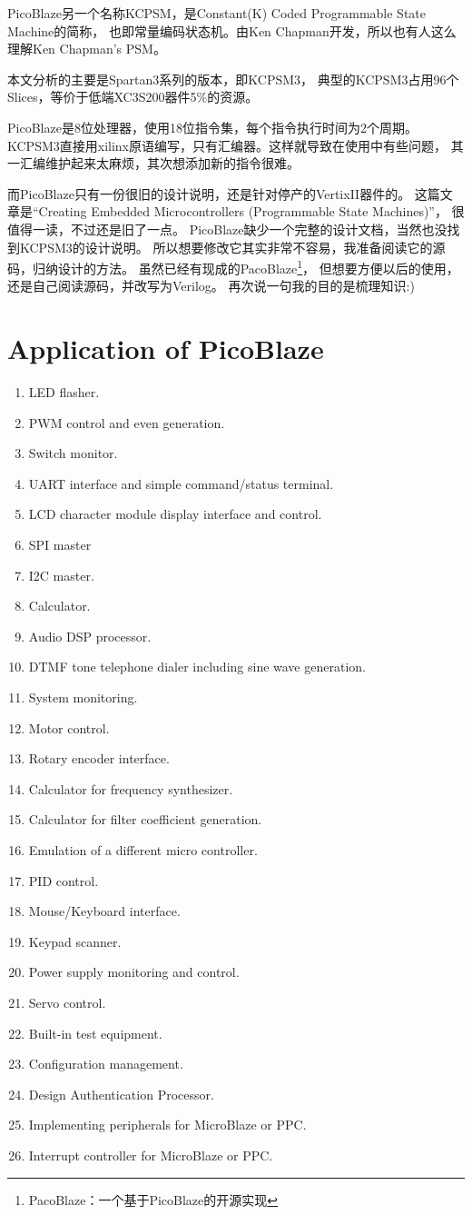 PicoBlaze另一个名称KCPSM，是Constant(K) Coded Programmable State Machine的简称，
也即常量编码状态机。由Ken Chapman开发，所以也有人这么理解Ken Chapman's PSM。

本文分析的主要是Spartan3系列的版本，即KCPSM3，
典型的KCPSM3占用96个Slices，等价于低端XC3S200器件5\%的资源。

PicoBlaze是8位处理器，使用18位指令集，每个指令执行时间为2个周期。 
KCPSM3直接用xilinx原语编写，只有汇编器。这样就导致在使用中有些问题，
其一汇编维护起来太麻烦，其次想添加新的指令很难。

而PicoBlaze只有一份很旧的设计说明，还是针对停产的VertixII器件的。
这篇文章是“Creating Embedded Microcontrollers (Programmable State Machines)”，
很值得一读，不过还是旧了一点。
PicoBlaze缺少一个完整的设计文档，当然也没找到KCPSM3的设计说明。
所以想要修改它其实非常不容易，我准备阅读它的源码，归纳设计的方法。
虽然已经有现成的PacoBlaze\footnote{PacoBlaze：一个基于PicoBlaze的开源实现}，
但想要方便以后的使用，还是自己阅读源码，并改写为Verilog。
再次说一句我的目的是梳理知识:)

\clearpage
\section{Application of PicoBlaze}
\begin{enumerate}
\item LED flasher.
\item PWM control and even generation.
\item Switch monitor.
\item UART interface and simple command/status terminal.
\item LCD character module display interface and control.
\item SPI master
\item I2C master.
\item Calculator.
\item Audio DSP processor.
\item DTMF tone telephone dialer including sine wave generation.
\item System monitoring.
\item Motor control.
\item Rotary encoder interface.
\item Calculator for frequency synthesizer.
\item Calculator for filter coefficient generation.
\item Emulation of a different micro controller.
\item PID control.
\item Mouse/Keyboard interface.
\item Keypad scanner.
\item Power supply monitoring and control.
\item Servo control.
\item Built-in test equipment.
\item Configuration management.
\item Design Authentication Processor.
\item Implementing peripherals for MicroBlaze or PPC.
\item Interrupt controller for MicroBlaze or PPC.
\end{enumerate}

